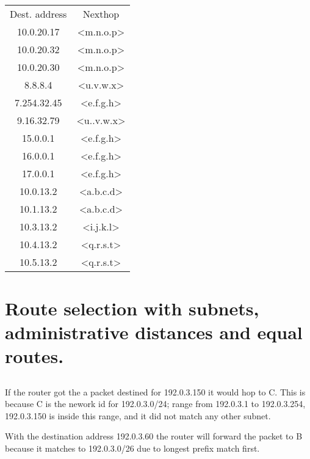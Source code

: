 \documentclass{article}
\begin{document}
\subsection{}

\begin{table}[!h]
\begin{tabular}{c|c}
    Dest. address & Nexthop  \\
   10.0.20.17 & <m.n.o.p> \\
   10.0.20.32 & <m.n.o.p> \\
   10.0.20.30 & <m.n.o.p> \\ 
   8.8.8.4 & <u.v.w.x> \\
   7.254.32.45 & <e.f.g.h> \\ 
   9.16.32.79 & <u..v.w.x> \\
   15.0.0.1 & <e.f.g.h> \\
   16.0.0.1 & <e.f.g.h> \\ 
   17.0.0.1 & <e.f.g.h> \\
   10.0.13.2 & <a.b.c.d> \\
   10.1.13.2 & <a.b.c.d> \\ 
   10.3.13.2 & <i.j.k.l> \\ 
   10.4.13.2 & <q.r.s.t> \\ 
   10.5.13.2 & <q.r.s.t> 
   
\end{tabular}
\end{table}



\section{Route selection with subnets, administrative distances and equal routes.}

\subsection{}
If the router got the a packet destined for 192.0.3.150 it would hop to C. This is because C is the nework id for 192.0.3.0/24; range from 192.0.3.1 to 192.0.3.254, 192.0.3.150 is inside this range, and it did not match any other subnet. 

With the destination address 192.0.3.60 the router will forward the packet to B because it matches to 192.0.3.0/26 due to longest prefix match first. 


\subsection{}
\end{document}
